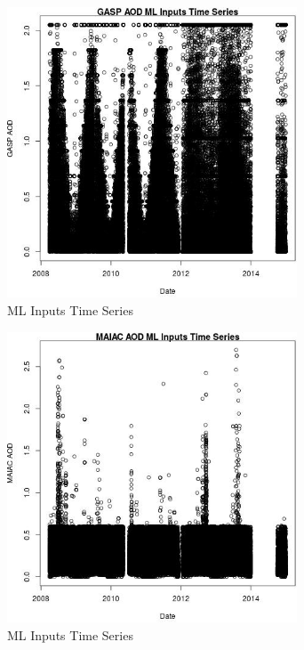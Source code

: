 \begin{figure} 
\centering  
\includegraphics[width=0.77\textwidth]{Code_Outputs/Report_ML_input_PM25_Step4_part_e_de_duplicated_aves_GASP_AODvDate.jpg} 
\caption{\label{fig:Report_ML_input_PM25_Step4_part_e_de_duplicated_avesGASP_AODvDate}ML Inputs Time Series} 
\end{figure} 
 

\begin{figure} 
\centering  
\includegraphics[width=0.77\textwidth]{Code_Outputs/Report_ML_input_PM25_Step4_part_e_de_duplicated_aves_MAIAC_AODvDate.jpg} 
\caption{\label{fig:Report_ML_input_PM25_Step4_part_e_de_duplicated_avesMAIAC_AODvDate}ML Inputs Time Series} 
\end{figure} 
 

